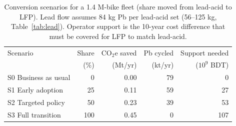 \begin{table}[t]
\caption{Conversion scenarios for a 1.4 M-bike fleet (share moved from lead-acid to LFP). Lead flow assumes 84 kg Pb per lead-acid set (56--125 kg, Table~\ref{tab:lead}). Operator support is the 10-year cost difference that must be covered for LFP to match lead-acid.}
\label{tab:policy}
\centering\footnotesize
\setlength{\tabcolsep}{3pt}
\begin{tabular}{lrrrr}
\hline
Scenario & Share & CO$_2$e saved & Pb cycled & Support needed \\
 & (\%) & (Mt/yr) & (kt/yr) & ($10^9$ BDT) \\
\hline
S0 Business as usual & 0 & 0.00 & 79 & 0 \\
S1 Early adoption & 25 & 0.11 & 59 & 27 \\
S2 Targeted policy & 50 & 0.23 & 39 & 53 \\
S3 Full transition & 100 & 0.45 & 0 & 107 \\
\hline
\end{tabular}
\end{table}
